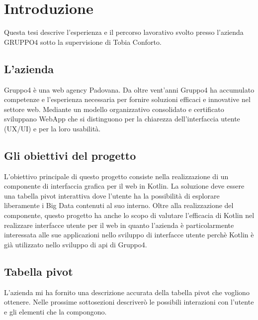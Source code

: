 
\chapter{Introduzione}
\label{cap:introduzione}

Questa tesi descrive l'esperienza e il percorso lavorativo svolto presso l'azienda GRUPPO4 sotto la supervisione di Tobia Conforto.

\section{L'azienda}
Gruppo4 è una web agency Padovana. Da oltre vent'anni Gruppo4 ha accumulato competenze e l'esperienza necessaria per fornire soluzioni efficaci e innovative nel settore web. Mediante un modello organizzativo consolidato e certificato sviluppano WebApp che si distinguono per la chiarezza dell'interfaccia utente (UX/UI) e per la loro usabilità.

\section{Gli obiettivi del progetto}
L'obiettivo principale di questo progetto consiste nella realizzazione di un componente di interfaccia grafica per il web in Kotlin. La soluzione deve essere una tabella pivot interattiva dove l'utente ha la possibilità di esplorare liberamente i Big Data contenuti al suo interno. Oltre alla realizzazione del componente, questo progetto ha anche lo scopo di valutare l'efficacia di Kotlin nel realizzare interfacce utente per il web in quanto l'azienda è particolarmente interessata alle sue applicazioni nello sviluppo di interfacce utente perchè Kotlin è già utilizzato nello sviluppo di \gls{api} di Gruppo4.

\section{Tabella pivot}
L'azienda mi ha fornito una descrizione accurata della tabella pivot che vogliono ottenere. Nelle prossime sottosezioni descriverò le possibili interazioni con l'utente e gli elementi che la compongono.
